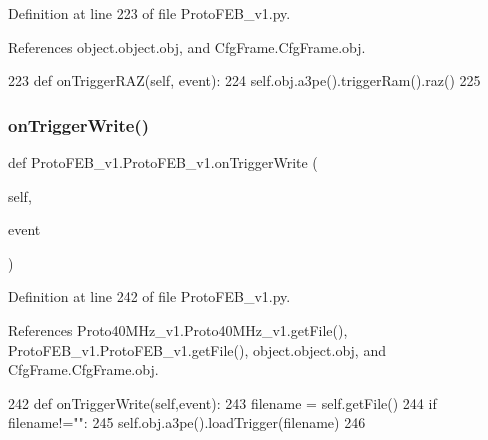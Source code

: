 Definition at line 223 of file Proto\+F\+E\+B\+\_\+v1.\+py.



References object.\+object.\+obj, and Cfg\+Frame.\+Cfg\+Frame.\+obj.


\begin{DoxyCode}
223     \textcolor{keyword}{def }onTriggerRAZ(self, event):
224         self.obj.a3pe().triggerRam().raz()
225 
\end{DoxyCode}
\mbox{\label{classProtoFEB__v1_1_1ProtoFEB__v1_aaadfd193fc5d2893dca1b37ebab68a0f}} 
\subsubsection{\texorpdfstring{on\+Trigger\+Write()}{onTriggerWrite()}}
{\footnotesize\ttfamily def Proto\+F\+E\+B\+\_\+v1.\+Proto\+F\+E\+B\+\_\+v1.\+on\+Trigger\+Write (\begin{DoxyParamCaption}\item[{}]{self,  }\item[{}]{event }\end{DoxyParamCaption})}



Definition at line 242 of file Proto\+F\+E\+B\+\_\+v1.\+py.



References Proto40\+M\+Hz\+\_\+v1.\+Proto40\+M\+Hz\+\_\+v1.\+get\+File(), Proto\+F\+E\+B\+\_\+v1.\+Proto\+F\+E\+B\+\_\+v1.\+get\+File(), object.\+object.\+obj, and Cfg\+Frame.\+Cfg\+Frame.\+obj.


\begin{DoxyCode}
242     \textcolor{keyword}{def }onTriggerWrite(self,event):
243         filename = self.getFile()
244         \textcolor{keywordflow}{if} filename!=\textcolor{stringliteral}{""}:
245             self.obj.a3pe().loadTrigger(filename)
246 
\end{DoxyCode}
\mbox{\label{classProtoFEB__v1_1_1ProtoFEB__v1_a694594dcf119e0a6055a54dc108f14e6}} 
